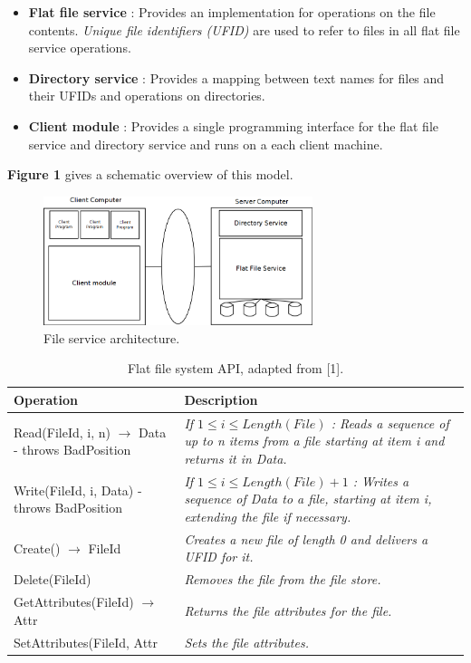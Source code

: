 \begin{itemize}
	\item \textbf{Flat file service} : Provides an implementation for operations on the file contents. \emph{Unique file identifiers (UFID)} are used to refer to files in all flat file service operations.
	\item \textbf{Directory service} : Provides a mapping between text names for files and their UFIDs and operations on directories.
	\item \textbf{Client module} : Provides a single programming interface for the flat file service and directory service and runs on a each client machine.
\end{itemize}

\textbf{Figure 1} gives a schematic overview of this model.


\begin{figure}
	\begin{center}
		\includegraphics[width=0.7\textwidth]{img/fileservicearchitecture}
	\end{center}
	\caption{File service architecture.}
	\label{fig:fileservicearchitecture}
\end{figure}


\begin{table}
	\caption{Flat file system API, adapted from [1].}
	\label{tab:api:flatfilesystem}
	\begin{tabular}{p{150px} | p{250px}}
		\textbf{Operation} & \textbf{Description} \\
		\hline
		Read(FileId, i, n) $\rightarrow$ Data - throws BadPosition 	& \emph{If $1 \leq i \leq Length(File)$ : Reads a sequence of up to n items from a file starting at item i and returns it in Data.} \\
		Write(FileId, i, Data) - throws BadPosition 						& \emph{If $1 \leq i \leq Length(File)+1$ : Writes a sequence of Data to a file, starting at item i, extending the file if necessary.} \\
		Create() $\rightarrow$ FileId 																& \emph{Creates a new file of length 0 and delivers a UFID for it.} \\
		Delete(FileId) 																					& \emph{Removes the file from the file store.} \\
		GetAttributes(FileId) $\rightarrow$ Attr 										& \emph{Returns the file attributes for the file.} \\
		SetAttributes(FileId, Attr & \emph{Sets the file attributes.} \\
		\hline
	\end{tabular}
\end{table}


